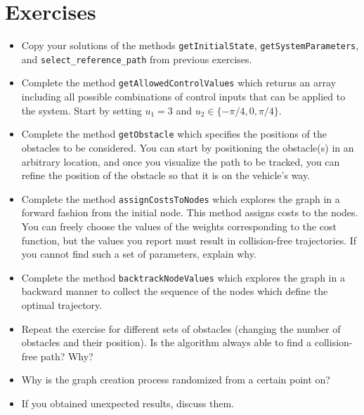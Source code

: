 \section{Exercises}
	\begin{itemize}
		\item Copy your solutions of the methods \texttt{getInitialState}, \texttt{getSystemParameters}, \newline and \texttt{select\_reference\_path} from previous exercises. 
		\item Complete the method \texttt{getAllowedControlValues} which returns an array including all possible combinations of control inputs that can be applied to the system. 
		Start by setting %
		$u_1 = 3$ %
		and %
		$u_2 \in \lbrace -\pi/4, 0, \pi/4 \rbrace$.
		\item Complete the method \texttt{getObstacle} which specifies the positions of the obstacles to be considered. You can start by positioning the obstacle(s) in an arbitrary location, and once you  visualize the path to be tracked, you can refine the position of the obstacle so that it is on the vehicle's way. 
		\item Complete the method \texttt{assignCostsToNodes} which explores the graph in a forward fashion from the initial node. This method assigns costs to the nodes. 
			You can freely choose the values of the weights corresponding to the cost function, but the values you report must result in collision-free trajectories. 
			If you cannot find such a set of parameters, explain why. 
		\item Complete the method \texttt{backtrackNodeValues} which explores the graph in a backward manner to collect the sequence of the nodes which define the optimal trajectory. 
		\item Repeat the exercise for different sets of obstacles (changing the number of obstacles and their position). 
		Is the algorithm always able to find a collision-free path? Why? 
		\item Why is the graph creation process randomized from a certain point on?
		\item If you obtained unexpected results, discuss them. 
	\end{itemize}
